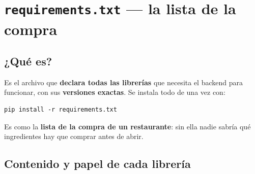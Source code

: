 \documentclass[11pt,a4paper]{article}
\begin{document}
\section{\texttt{requirements.txt} --- la lista de la compra}

\subsection{¿Qué es?}

Es el archivo que \textbf{declara todas las librerías} que necesita el backend para funcionar,
con sus \textbf{versiones exactas}. Se instala todo de una vez con:

\begin{lstlisting}
pip install -r requirements.txt
\end{lstlisting}

\begin{analogia}
Es como la \textbf{lista de la compra de un restaurante}: sin ella nadie sabría qué
ingredientes hay que comprar antes de abrir.
\end{analogia}

\subsection{Contenido y papel de cada librería}
\end{document}
